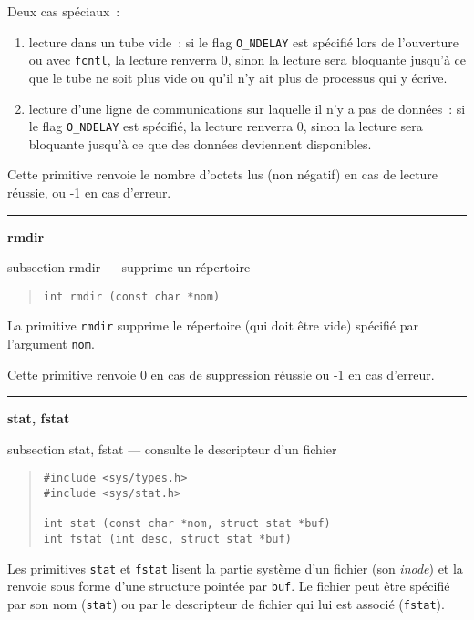 \documentclass [twoside] {report}
\newcommand {\primitive} [1]
    {
	{\large \bf #1}
	\addcontentsline {toc} {subsection} {#1}
    }
\newcommand {\separation}
    {
	\vspace {7mm}
	\nopagebreak
	\hrule
    }
\begin{document}
Deux cas spéciaux~:

\begin {enumerate}
    \item lecture dans un tube vide~: si le flag {\tt O\_NDELAY}
	est spécifié lors de l'ouverture ou avec {\tt fcntl},
	la lecture renverra 0, sinon la lecture
	sera bloquante jusqu'à ce que le tube ne soit plus
	vide ou qu'il n'y ait plus de processus qui y écrive.
    \item lecture d'une ligne de communications sur
	laquelle il n'y a pas de données~: si le flag {\tt O\_NDELAY}
	est spécifié, la lecture renverra 0, sinon la lecture
	sera bloquante jusqu'à ce que des données
	deviennent disponibles.
\end {enumerate}

Cette primitive renvoie le nombre d'octets lus
(non négatif) en cas de lecture
réussie, ou -1 en cas d'erreur.




\separation
\primitive {rmdir} --- supprime un répertoire

\begin {quote}
\begin {verbatim}
int rmdir (const char *nom)
\end{verbatim}
\end {quote}

La primitive {\tt rmdir} supprime le répertoire (qui doit être vide)
spécifié par l'argument {\tt nom}.

Cette primitive renvoie 0 en cas de suppression réussie
ou -1 en cas d'erreur.




\separation
\primitive {stat, fstat} --- consulte le descripteur d'un fichier

\begin {quote}
\begin {verbatim}
#include <sys/types.h>
#include <sys/stat.h>

int stat (const char *nom, struct stat *buf)
int fstat (int desc, struct stat *buf)
\end{verbatim}
\end {quote}

Les primitives {\tt stat} et {\tt fstat} lisent la partie
système d'un fichier (son {\it inode}) et la renvoie
sous forme d'une structure pointée par {\tt buf}. Le
fichier peut être spécifié par son nom ({\tt stat})
ou par le descripteur de fichier qui lui est
associé ({\tt fstat}).
\end{document}
